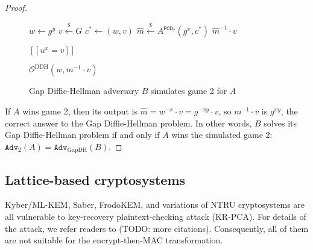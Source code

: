 \documentclass[runningheads]{llncs}
\newcommand{\pco}{\texttt{PCO}}
\newcommand{\leftsample}{\stackrel{\$}{\leftarrow}}
\newcommand{\llbrack}{[\![}
\newcommand{\rrbrack}{]\!]}
\newcommand{\adv}{\texttt{Adv}}
\begin{document}
\begin{proof}
\begin{figure}[h]
        \begin{minipage}[t]{0.45\textwidth}
            \begin{algorithm}[H]
                \caption*{$B^{\mathcal{O}^\text{DDH}}(g, g^x, g^y)$}
                \begin{algorithmic}[1]
                    \State $w \leftarrow g^y$
                    \State $v \leftsample G$
                    \State $c^\ast \leftarrow (w, v)$
                    \State $\hat{m} \leftsample A^{\pco_2}(g^x, c^\ast)$
                    \State \Return $\hat{m}^{-1}\cdot v$
                \end{algorithmic}
            \end{algorithm}
        \end{minipage}
        \begin{minipage}[t]{0.45\textwidth}
            \begin{algorithm}[H]
                \caption*{$\mathcal{O}^\text{DDH}(u, v)$}
                \begin{algorithmic}[1]
                    \State \Return $\llbrack u^x = v \rrbrack$
                \end{algorithmic}
            \end{algorithm}\vspace{-0.3cm}
            \begin{algorithm}[H]
                \caption*{$\pco_2(m, c=(w, v))$}
                \begin{algorithmic}[1]
                    \State \Return $\mathcal{O}^\text{DDH}(w, m^{-1}\cdot v)$
                \end{algorithmic}
            \end{algorithm}
        \end{minipage}

        \caption{Gap Diffie-Hellman adversary $B$ simulates game 2 for $A$}\label{fig:ow-pca-to-gap-dh}
    \end{figure}

    If $A$ wins game 2, then its output is $\hat{m} = w^{-x}\cdot v = g^{-xy}\cdot v$, so $m^{-1}\cdot v$ is $g^{xy}$, the correct answer to the Gap Diffie-Hellman problem. In other words, $B$ solves its Gap Diffie-Hellman problem if and only if $A$ wins the simulated game 2: $\adv_2(A) = \adv_\text{GapDH}(B)$.
\end{proof}

\subsection{Lattice-based cryptosystems}
Kyber/ML-KEM, Saber, FrodoKEM, and variations of NTRU cryptosystems are all vulnerable to key-recovery plaintext-checking attack (KR-PCA). For details of the attack, we refer readers to \cite{ueno2022curse} (TODO: more citations). Consequently, all of them are not suitable for the encrypt-then-MAC transformation.
\end{document}
